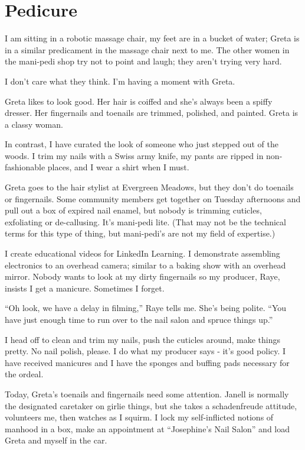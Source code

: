 \documentclass[
  letterpaper,
  DIV=11,
  numbers=noendperiod]{scrreprt}
\begin{document}

\chapter*{Pedicure}\label{pedicure}


I am sitting in a robotic massage chair, my feet are in a bucket of
water; Greta is in a similar predicament in the massage chair next to
me. The other women in the mani-pedi shop try not to point and laugh;
they aren't trying very hard.

I don't care what they think. I'm having a moment with Greta.

Greta likes to look good. Her hair is coiffed and she's always been a
spiffy dresser. Her fingernails and toenails are trimmed, polished, and
painted. Greta is a classy woman.

In contrast, I have curated the look of someone who just stepped out of
the woods. I trim my nails with a Swiss army knife, my pants are ripped
in non-fashionable places, and I wear a shirt when I must.

Greta goes to the hair stylist at Evergreen Meadows, but they don't do
toenails or fingernails. Some community members get together on Tuesday
afternoons and pull out a box of expired nail enamel, but nobody is
trimming cuticles, exfoliating or de-callusing. It's mani-pedi lite.
(That may not be the technical terms for this type of thing, but
mani-pedi's are not my field of expertise.)

I create educational videos for LinkedIn Learning. I demonstrate
assembling electronics to an overhead camera; similar to a baking show
with an overhead mirror. Nobody wants to look at my dirty fingernails so
my producer, Raye, insists I get a manicure. Sometimes I forget.

``Oh look, we have a delay in filming,'' Raye tells me. She's being
polite. ``You have just enough time to run over to the nail salon and
spruce things up.''

I head off to clean and trim my nails, push the cuticles around, make
things pretty. No nail polish, please. I do what my producer says - it's
good policy. I have received manicures and I have the sponges and
buffing pads necessary for the ordeal.

Today, Greta's toenails and fingernails need some attention. Janell is
normally the designated caretaker on girlie things, but she takes a
schadenfreude attitude, volunteers me, then watches as I squirm. I lock
my self-inflicted notions of manhood in a box, make an appointment at
``Josephine's Nail Salon'' and load Greta and myself in the car.
\end{document}
